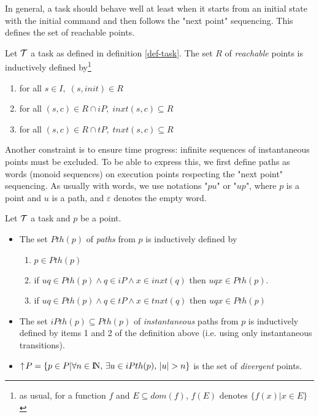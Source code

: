 \documentclass{article}
\newcommand{\NAT}{\mbox{\normalfont I$\!$N}}
\begin{document}
In general, a task should behave well at least when it starts from an initial state with the initial command and then follows the "next point" sequencing. This defines the set of reachable points.
\begin{definition}\label{def-reach}Let ${\cal T}$ a task as defined in definition \ref{def-task}.
The set $R$ of {\em reachable} points is inductively defined by\footnote{as usual, for a function $f$ and $E\subseteq dom(f)$, $f(E)$ denotes $\{f(x)|x\in E\}$}
\begin{enumerate}
\item for all $s\in I,\; (s,init)\in R$
\item for all $(s,c)\in R\cap iP,\; inxt(s,c)\subseteq R$
\item for all $(s,c)\in R\cap tP,\; tnxt(s,c)\subseteq R$
\end{enumerate}
\end{definition}
Another constraint is to ensure time progress: infinite sequences of instantaneous points must be excluded. To be able to express this, we first define paths as words (monoid sequences) on execution points respecting the "next point" sequencing. As usually with words, we use notations "$pu$" or "$up$", where $p$ is a point and $u$ is a path, and $\varepsilon$ denotes the empty word.
\begin{definition}[Paths]\label{def-path}Let ${\cal T}$ a task and $p$ be a point.
\begin{itemize}
\item The set $Pth(p)$ of {\em paths} from $p$ is inductively defined by
   \begin{enumerate}
	 \item $p\in Pth(p)$
   \item if $uq\in Pth(p)\wedge q\in iP\wedge x\in inxt(q)$ then $uqx\in Pth(p)$.
   \item if $uq\in Pth(p)\wedge q\in tP\wedge x\in tnxt(q)$ then $uqx\in Pth(p)$
   \end{enumerate}

\item The set $iPth(p)\subseteq Pth(p)$ of {\em instantaneous} paths from $p$ is inductively defined by items 1 and 2 of the definition above (i.e. using only instantaneous transitions).
\item $\uparrow\!P=\{p\in P|\forall n\in\NAT,\,\exists u\in iPth(p),\,|u|>n\}$ is the set of {\em divergent} points.

\end{itemize}
\end{definition}
\end{document}
